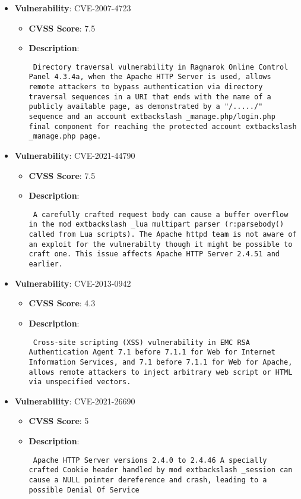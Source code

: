 \documentclass{article}
\begin{document}
\begin{itemize}
        \item \textbf{Vulnerability}: CVE-2007-4723
        \begin{itemize}
            \item \textbf{CVSS Score}:  7.5 
            \item \textbf{Description}: \parbox{\linewidth}{\texttt{ Directory traversal vulnerability in Ragnarok Online Control Panel 4.3.4a, when the Apache HTTP Server is used, allows remote attackers to bypass authentication via directory traversal sequences in a URI that ends with the name of a publicly available page, as demonstrated by a "/...../" sequence and an account	extbackslash _manage.php/login.php final component for reaching the protected account	extbackslash _manage.php page. }}
        \end{itemize}
    
        \item \textbf{Vulnerability}: CVE-2021-44790
        \begin{itemize}
            \item \textbf{CVSS Score}:  7.5 
            \item \textbf{Description}: \parbox{\linewidth}{\texttt{ A carefully crafted request body can cause a buffer overflow in the mod	extbackslash _lua multipart parser (r:parsebody() called from Lua scripts). The Apache httpd team is not aware of an exploit for the vulnerabilty though it might be possible to craft one. This issue affects Apache HTTP Server 2.4.51 and earlier. }}
        \end{itemize}
    
        \item \textbf{Vulnerability}: CVE-2013-0942
        \begin{itemize}
            \item \textbf{CVSS Score}:  4.3 
            \item \textbf{Description}: \parbox{\linewidth}{\texttt{ Cross-site scripting (XSS) vulnerability in EMC RSA Authentication Agent 7.1 before 7.1.1 for Web for Internet Information Services, and 7.1 before 7.1.1 for Web for Apache, allows remote attackers to inject arbitrary web script or HTML via unspecified vectors. }}
        \end{itemize}
    
        \item \textbf{Vulnerability}: CVE-2021-26690
        \begin{itemize}
            \item \textbf{CVSS Score}:  5 
            \item \textbf{Description}: \parbox{\linewidth}{\texttt{ Apache HTTP Server versions 2.4.0 to 2.4.46 A specially crafted Cookie header handled by mod	extbackslash _session can cause a NULL pointer dereference and crash, leading to a possible Denial Of Service }}
        \end{itemize}
    

\end{itemize}
\end{document}
